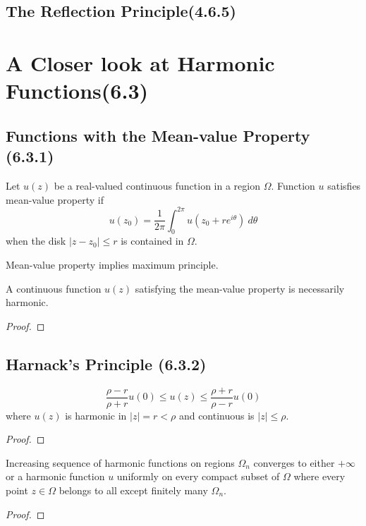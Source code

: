 \subsection{The Reflection Principle(4.6.5)}

\section{A Closer look at Harmonic Functions(6.3)}
\subsection{Functions with the Mean-value Property (6.3.1)}
\begin{definition}
	Let $u(z)$ be a real-valued continuous function in a region $\Omega$. Function $u$ satisfies mean-value property if
	\[ u(z_0) = \frac{1}{2\pi} \int_0^{2\pi} u(z_0+re^{i\theta})\ d\theta \]
	when the disk $|z-z_0| \le r$ is contained in $\Omega$.
\end{definition}
\begin{remark}
	Mean-value property implies maximum principle.
\end{remark}
\begin{theorem}
	A continuous function $u(z)$ satisfying the mean-value property is necessarily harmonic.
\end{theorem}
\begin{proof}
\end{proof}

\subsection{Harnack's Principle (6.3.2)}
\begin{theorem}
	\[ \frac{\rho-r}{\rho+r} u(0) \le u(z) \le \frac{\rho+r}{\rho-r}u(0) \]
	where $u(z)$ is harmonic in $|z| = r < \rho$ and continuous is $|z| \le \rho$.
\end{theorem}
\begin{proof}
\end{proof}

\begin{theorem}
	Increasing sequence of harmonic functions on regions $\Omega_n$ converges to either $+\infty$ or a harmonic function $u$ uniformly on every compact subset of $\Omega$ where every point $z \in \Omega$ belongs to all except finitely many $\Omega_n$.
\end{theorem}
\begin{proof}
\end{proof}

